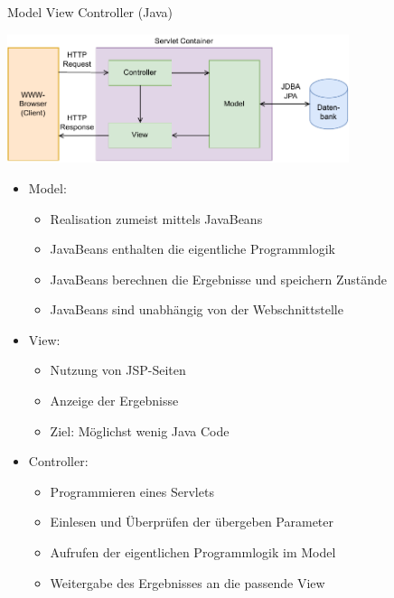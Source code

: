\begin{defi}{Model View Controller (Java)}
    \begin{center}
        \includegraphics[width=0.75\textwidth]{includes/figures/defi_model_view_controller.pdf}
    \end{center}

    \begin{itemize}
        \item Model:
              \begin{itemize}
                  \item Realisation zumeist mittels JavaBeans
                  \item JavaBeans enthalten die eigentliche Programmlogik
                  \item JavaBeans berechnen die Ergebnisse und speichern Zustände
                  \item JavaBeans sind unabhängig von der Webschnittstelle
              \end{itemize}
        \item View:
              \begin{itemize}
                  \item Nutzung von JSP-Seiten
                  \item Anzeige der Ergebnisse
                  \item Ziel: Möglichst wenig Java Code
              \end{itemize}
        \item Controller:
              \begin{itemize}
                  \item Programmieren eines Servlets
                  \item Einlesen und Überprüfen der übergeben Parameter
                  \item Aufrufen der eigentlichen Programmlogik im Model
                  \item Weitergabe des Ergebnisses an die passende View
              \end{itemize}
    \end{itemize}
\end{defi}

